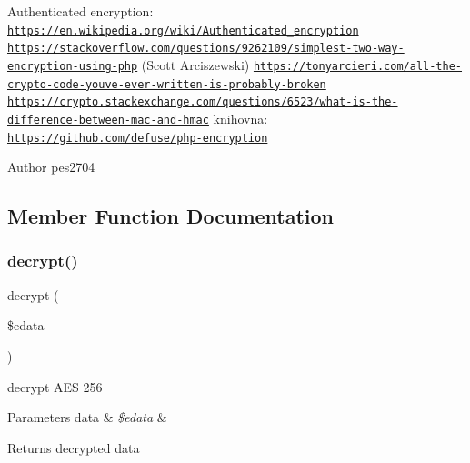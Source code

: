 Authenticated encryption\+: \href{https://en.wikipedia.org/wiki/Authenticated_encryption}{\tt https\+://en.\+wikipedia.\+org/wiki/\+Authenticated\+\_\+encryption} \href{https://stackoverflow.com/questions/9262109/simplest-two-way-encryption-using-php}{\tt https\+://stackoverflow.\+com/questions/9262109/simplest-\/two-\/way-\/encryption-\/using-\/php} (Scott Arciszewski) \href{https://tonyarcieri.com/all-the-crypto-code-youve-ever-written-is-probably-broken}{\tt https\+://tonyarcieri.\+com/all-\/the-\/crypto-\/code-\/youve-\/ever-\/written-\/is-\/probably-\/broken} \href{https://crypto.stackexchange.com/questions/6523/what-is-the-difference-between-mac-and-hmac}{\tt https\+://crypto.\+stackexchange.\+com/questions/6523/what-\/is-\/the-\/difference-\/between-\/mac-\/and-\/hmac} knihovna\+: \href{https://github.com/defuse/php-encryption}{\tt https\+://github.\+com/defuse/php-\/encryption}

\begin{DoxyAuthor}{Author}
pes2704 
\end{DoxyAuthor}


\subsection{Member Function Documentation}
\mbox{\label{class_pes_1_1_security_1_1_cryptor_1_1_cryptor_a_e_s_p_h_p5_aed69cdc691e1155856c905ee1c08d9b7}} 
\subsubsection{\texorpdfstring{decrypt()}{decrypt()}}
{\footnotesize\ttfamily decrypt (\begin{DoxyParamCaption}\item[{}]{\$edata }\end{DoxyParamCaption})}

decrypt A\+ES 256


\begin{DoxyParams}[1]{Parameters}
data & {\em \$edata} & \\
\hline
\end{DoxyParams}
\begin{DoxyReturn}{Returns}
decrypted data 
\end{DoxyReturn}


